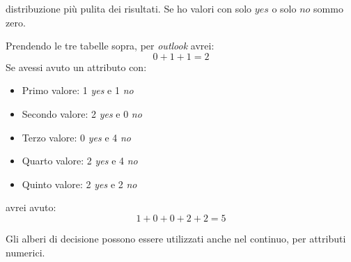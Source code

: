 distribuzione più pulita dei risultati. Se ho valori con solo
$yes$ o solo $no$ sommo zero.
\begin{esempio}
  Prendendo le tre tabelle sopra, per \textit{outlook} avrei:
  \[0+1+1=2\]
  Se avessi avuto un attributo con:
  \begin{itemize}
    \item Primo valore: 1 \textit{yes} e 1 \textit{no}
    \item Secondo valore: 2 \textit{yes} e 0 \textit{no}
    \item Terzo valore: 0 \textit{yes} e 4 \textit{no}
    \item Quarto valore: 2 \textit{yes} e 4 \textit{no}
    \item Quinto valore: 2 \textit{yes} e 2 \textit{no} 
  \end{itemize}
  avrei avuto:
  \[1+0+0+2+2=5\]
\end{esempio}
Gli alberi di decisione possono essere utilizzati anche nel continuo, per
attributi numerici.
